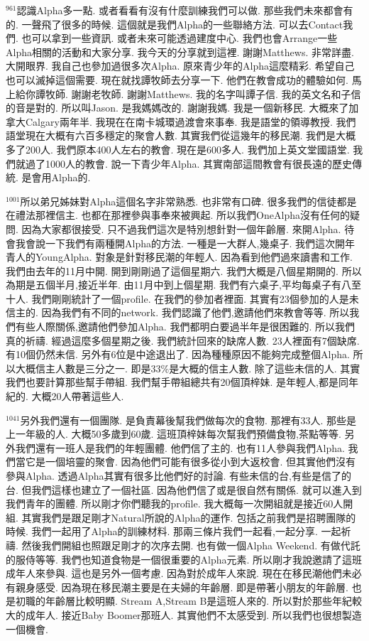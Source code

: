 \documentclass{book}
\begin{document}
$^{961}$認識Alpha多一點.
或者看看有沒有什麼訓練我們可以做.
那些我們未來都會有的.
一聲飛了很多的時候.
這個就是我們Alpha的一些聯絡方法.
可以去Contact我們.
也可以拿到一些資訊.
或者未來可能透過建度中心.
我們也會Arrange一些Alpha相關的活動和大家分享.
我今天的分享就到這裡.
謝謝Matthews.
非常詳盡.
大開眼界.
我自己也參加過很多次Alpha.
原來青少年的Alpha這麼精彩.
希望自己也可以滅掉這個需要.
現在就找譚牧師去分享一下.
他們在教會成功的體驗如何.
馬上給你譚牧師.
謝謝老牧師.
謝謝Matthews.
我的名字叫譚子信.
我的英文名和子信的音是對的.
所以叫Jason.
是我媽媽改的.
謝謝我媽.
我是一個新移民.
大概來了加拿大Calgary兩年半.
我現在在南卡城環過渡會來事奉.
我是語堂的領導教授.
我們語堂現在大概有六百多穩定的聚會人數.
其實我們從這幾年的移民潮.
我們是大概多了200人.
我們原本400人左右的教會.
現在是600多人.
我們加上英文堂國語堂.
我們就過了1000人的教會.
說一下青少年Alpha.
其實南部這間教會有很長遠的歷史傳統.
是會用Alpha的.

$^{1001}$所以弟兄姊妹對Alpha這個名字非常熟悉.
也非常有口碑.
很多我們的信徒都是在禮法那裡信主.
也都在那裡參與事奉來被興起.
所以我們OneAlpha沒有任何的疑問.
因為大家都很接受.
只不過我們這次是特別想針對一個年齡層.
來開Alpha.
待會我會說一下我們有兩種開Alpha的方法.
一種是一大群人,幾桌子.
我們這次開年青人的YoungAlpha.
對象是針對移民潮的年輕人.
因為看到他們過來讀書和工作.
我們由去年的11月中開.
開到剛剛過了這個星期六.
我們大概是八個星期開的.
所以為期是五個半月,接近半年.
由11月中到上個星期.
我們有六桌子,平均每桌子有八至十人.
我們剛剛統計了一個profile.
在我們的參加者裡面.
其實有23個參加的人是未信主的.
因為我們有不同的network.
我們認識了他們,邀請他們來教會等等.
所以我們有些人際關係,邀請他們參加Alpha.
我們都明白要過半年是很困難的.
所以我們真的祈禱.
經過這麼多個星期之後.
我們統計回來的缺席人數.
23人裡面有7個缺席.
有10個仍然未信.
另外有6位是中途退出了.
因為種種原因不能夠完成整個Alpha.
所以大概信主人數是三分之一.
即是33\%是大概的信主人數.
除了這些未信的人.
其實我們也要計算那些幫手帶組.
我們幫手帶組總共有20個頂梓妹.
是年輕人,都是同年紀的.
大概20人帶著這些人.

$^{1041}$另外我們還有一個團隊.
是負責幕後幫我們做每次的食物.
那裡有33人.
那些是上一年級的人.
大概50多歲到60歲.
這班頂梓妹每次幫我們預備食物,茶點等等.
另外我們還有一班人是我們的年輕團體.
他們信了主的.
也有11人參與我們Alpha.
我們當它是一個培靈的聚會.
因為他們可能有很多從小到大返校會.
但其實他們沒有參與Alpha.
透過Alpha其實有很多比他們好的討論.
有些未信的台,有些是信了的台.
但我們這樣也建立了一個社區.
因為他們信了或是很自然有關係.
就可以進入到我們青年的團體.
所以剛才你們聽我的profile.
我大概每一次開組就是接近60人開組.
其實我們是跟足剛才Natural所說的Alpha的運作.
包括之前我們是招聘團隊的時候.
我們一起用了Alpha的訓練材料.
那兩三條片我們一起看,一起分享.
一起祈禱.
然後我們開組也照跟足剛才的次序去開.
也有做一個Alpha Weekend.
有做代託的服侍等等.
我們也知道食物是一個很重要的Alpha元素.
所以剛才我說邀請了這班成年人來參與.
這也是另外一個考慮.
因為對於成年人來說.
現在在移民潮他們未必有親身感受.
因為現在移民潮主要是在夫婦的年齡層.
即是帶著小朋友的年齡層.
也是初職的年齡層比較明顯.
Stream A,Stream B是這班人來的.
所以對於那些年紀較大的成年人.
接近Baby Boomer那班人.
其實他們不太感受到.
所以我們也很想製造一個機會.
\end{document}
